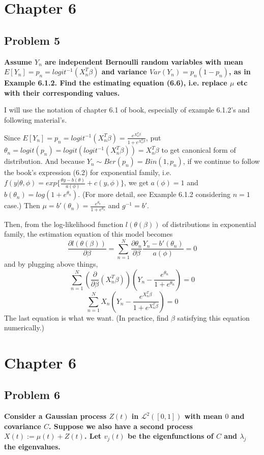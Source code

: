 \documentclass{article}
\begin{document}
\section{Chapter 6}
\subsection{Problem 5}
\textbf{
Assume $Y_n$ are independent Bernoulli random variables with mean $E[Y_n]=p_n=logit^{-1}(X_n^T\beta)$ and 
variance $Var(Y_n)=p_n(1-p_n)$, as in Example 6.1.2.
Find the estimating equation (6.6), i.e. replace $\mu$ etc with their corresponding values.
}

I will use the notation of chapter 6.1 of book, especially of example 6.1.2's and following material's.

Since $E[Y_n]=p_n=logit^{-1}(X_n^T\beta)=\frac{e^{X_n^T\beta}}{1+e^{X_n^T\beta}}$, 
put $\theta_n=logit(p_n)=logit(logit^{-1}(X_n^T\beta))=X_n^T\beta$ to get canonical form of distribution.
And because $Y_n\sim Ber(p_n) = Bin(1,p_n)$, if we continue to follow the book's expression (6.2) for exponential family, 
i.e. \(f(y|\theta,\phi)=exp\{\frac{\theta y - b(\theta)}{a(\phi)} + c(y,\phi)\}\), we get
$a(\phi)=1$ and $b(\theta_n)=log(1+e^{\theta_n})$.
(For more detail, see Example 6.1.2 considering $n=1$ case.)
Then $\mu=b'(\theta_n)=\frac{e^{\theta_n}}{1+e^{\theta_n}}$ and $g^{-1}=b'$.

Then, from the log-likelihood function $l(\theta(\beta))$ of distributions in exponential family, 
the estimation equation of this model becomes
\[\frac{\partial l(\theta(\beta))}{\partial\beta} = \sum_{n=1}^N \frac{\partial\theta_n}{\partial\beta} \frac{Y_n-b'(\theta_n)}{a(\phi)}=0\]
and by plugging above things,
\[\sum_{n=1}^N (\frac{\partial}{\partial\beta}(X_n^T\beta)) (Y_n-\frac{e^{\theta_n}}{1+e^{\theta_n}})=0\]
\[\sum_{n=1}^N X_n(Y_n-\frac{e^{X_n^T\beta}}{1+e^{X_n^T\beta}})=0\]
The last equation is what we want. (In practice, find $\beta$ satisfying this equation numerically.)

\section{Chapter 6}
\subsection{Problem 6}
\textbf{
Consider a Gaussian process $Z(t)$ in $\mathcal{L}^2([0,1])$ with mean $0$ and covariance $C$.
Suppose we also have a second process $X(t):=\mu(t)+Z(t)$.
Let $v_j(t)$ be the eigenfunctions of $C$ and $\lambda_j$ the eigenvalues.
}
\end{document}
